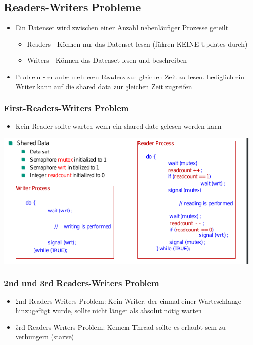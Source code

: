 \documentclass[a4paper]{scrreprt}
\begin{document}
	\subsection{Readers-Writers Probleme}
		\begin{itemize}
			\item Ein Datenset wird zwischen einer Anzahl nebenläufiger Prozesse geteilt
			\begin{itemize}
				\item Readers - Können nur das Datenset lesen (führen KEINE Updates durch)
				\item Writers - Können das Datenset lesen und beschreiben
			\end{itemize}
			\item Problem - erlaube mehreren Readers zur gleichen Zeit zu lesen. Lediglich ein Writer kann auf die shared data zur gleichen Zeit zugreifen
		\end{itemize}
			
			\subsubsection{First-Readers-Writers Problem}
				\begin{itemize}
					\item Kein Reader sollte warten wenn ein shared date gelesen werden kann
				\end{itemize}	
			\includegraphics[scale=0.6]{graphics/readerwriterprob.png}
			
			\subsubsection{2nd und 3rd Readers-Writers Problem}
				\begin{itemize}
					\item 2nd Readers-Writers Problem: Kein Writer, der einmal einer Warteschlange hinzugefügt wurde, sollte nicht länger als absolut nötig warten
					\item 3rd Readers-Writers Problem: Keinem Thread sollte es erlaubt sein zu verhungern (starve)
				\end{itemize}
\end{document}
